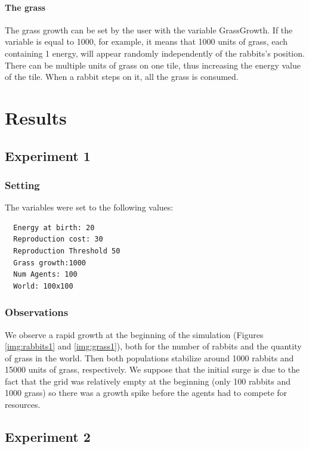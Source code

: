 \documentclass[11pt]{article}
\begin{document}
\paragraph{The grass} The grass growth can be set by the user with the variable GrassGrowth. If the variable is equal to 1000, for example, it means that 1000 units of grass, each containing 1 energy, will appear randomly independently of the rabbits's position. There can be multiple units of grass on one tile, thus increasing the energy value of the tile. When a rabbit steps on it, all the grass is consumed.

\section{Results}

\subsection{Experiment 1}

\subsubsection{Setting}
The variables were set to the following values:
\begin{lstlisting}
  Energy at birth: 20
  Reproduction cost: 30
  Reproduction Threshold 50
  Grass growth:1000
  Num Agents: 100
  World: 100x100
\end{lstlisting}
\subsubsection{Observations}
We observe a rapid growth at the beginning of the simulation (Figures \ref{img:rabbits1} and \ref{img:grass1}), both for the number of rabbits and the quantity of grass in the world. Then both populations stabilize around 1000 rabbits and 15000 units of grass, respectively. We suppose that the initial surge is due to the fact that the grid was relatively empty at the beginning (only 100 rabbits and 1000 grass) so there was a growth spike before the agents had to compete for resources.


\subsection{Experiment 2}
\end{document}
